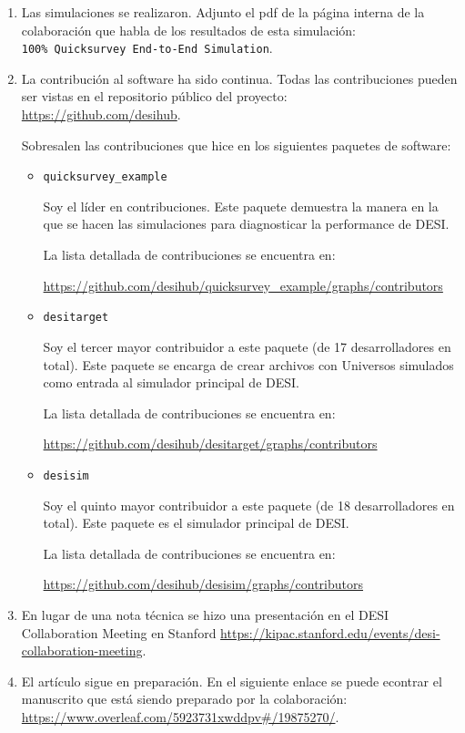 \documentclass[12pt,spanish]{article}
\begin{document}
\begin{enumerate}
\item Las simulaciones se realizaron. Adjunto el pdf de la p\'agina
  interna de la colaboraci\'on que habla de los resultados de esta simulaci\'on:\\
  \verb"100% Quicksurvey End-to-End Simulation".
\item La contribuci\'on al software ha sido continua. Todas las
  contribuciones pueden ser vistas en el repositorio p\'ublico del
  proyecto:\\ \url{https://github.com/desihub}.

Sobresalen las contribuciones que hice en los siguientes paquetes de software:
\begin{itemize}
\item{\texttt{quicksurvey\_example}


  Soy el l\'ider en contribuciones. Este paquete demuestra la manera
  en la que se hacen las simulaciones para diagnosticar la performance
  de DESI.


  La lista detallada de contribuciones se encuentra en:


 \url{https://github.com/desihub/quicksurvey_example/graphs/contributors}}

\item \texttt{desitarget}

Soy el tercer mayor contribuidor a este paquete (de 17 desarrolladores
en total). Este paquete se encarga de crear archivos con Universos
simulados como entrada al simulador principal de DESI.

La lista detallada de contribuciones se encuentra en:

\url{https://github.com/desihub/desitarget/graphs/contributors}

\item \texttt{desisim}

Soy el quinto mayor contribuidor a este paquete (de 18 desarrolladores
en total). Este paquete es el simulador principal de DESI.

La lista detallada de contribuciones se encuentra en:

\url{https://github.com/desihub/desisim/graphs/contributors}

\end{itemize}
\item En lugar de una nota t\'ecnica se hizo una presentaci\'on en el
  DESI Collaboration Meeting en Stanford
  \url{https://kipac.stanford.edu/events/desi-collaboration-meeting}. 
\item El art\'iculo sigue en preparaci\'on. En el siguiente enlace se
  puede econtrar el manuscrito que est\'a siendo preparado por la
  colaboraci\'on:\\ \url{https://www.overleaf.com/5923731xwddpv#/19875270/}.
  

\end{enumerate}
\end{document}
